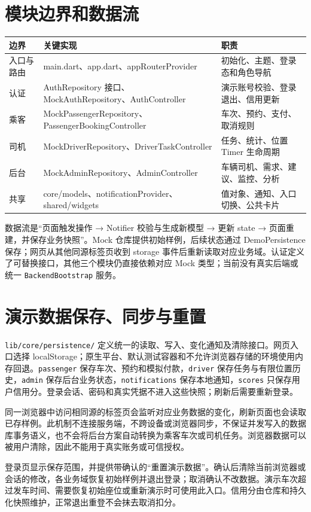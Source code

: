 \documentclass[UTF8,fontset=fandol,zihao=-4,oneside]{ctexrep}
\newcommand{\pathcode}[1]{\nolinkurl{#1}}
\begin{document}
\section{模块边界和数据流}
\begin{longtable}{p{3.7cm}p{5.5cm}p{5.5cm}}
\toprule 边界 & 关键实现 & 职责 \\ \midrule
入口与路由 & main.dart、app.dart、appRouterProvider & 初始化、主题、登录态和角色导航 \\
认证 & AuthRepository 接口、MockAuthRepository、AuthController & 演示账号校验、登录退出、信用更新 \\
乘客 & MockPassengerRepository、PassengerBookingController & 车次、预约、支付、取消规则 \\
司机 & MockDriverRepository、DriverTaskController & 任务、统计、位置 Timer 生命周期 \\
后台 & MockAdminRepository、AdminController & 车辆司机、需求、建议、监控、分析 \\
共享 & core/models、notificationProvider、shared/widgets & 值对象、通知、入口切换、公共卡片 \\
\bottomrule
\end{longtable}
数据流是“页面触发操作 → Notifier 校验与生成新模型 → 更新 state → 页面重建，并保存业务快照”。Mock 仓库提供初始样例，后续状态通过 DemoPersistence 保存；网页从其他同源标签页收到 storage 事件后重新读取对应业务域。认证定义了可替换接口，其他三个模块仍直接依赖对应 Mock 类型；当前没有真实后端或统一 \texttt{BackendBootstrap} 服务。

\section{演示数据保存、同步与重置}
\pathcode{lib/core/persistence/} 定义统一的读取、写入、变化通知及清除接口。网页入口选择 localStorage；原生平台、默认测试容器和不允许浏览器存储的环境使用内存回退。\texttt{passenger} 保存车次、预约和模拟付款，\texttt{driver} 保存任务与有限位置历史，\texttt{admin} 保存后台业务状态，\texttt{notifications} 保存本地通知，\texttt{scores} 只保存用户信用分。登录会话、密码和真实凭据不进入这些快照；刷新后需要重新登录。

同一浏览器中访问相同源的标签页会监听对应业务数据的变化，刷新页面也会读取已存样例。此机制不连接服务端，不跨设备或浏览器同步，不保证并发写入的数据库事务语义，也不会将后台方案自动转换为乘客车次或司机任务。浏览器数据可以被用户清除，因此不能用于真实账务或可信授权。

登录页显示保存范围，并提供带确认的“重置演示数据”。确认后清除当前浏览器或会话的修改，各业务域恢复初始样例并退出登录；取消确认不改数据。演示车次超过发车时间、需要恢复初始座位或重新演示时可使用此入口。信用分由仓库和持久化快照维护，正常退出重登不会抹去取消扣分。
\end{document}
